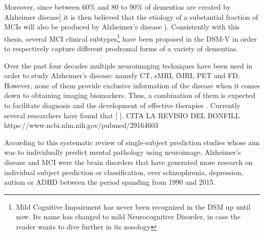 Moreover, since between 60\% and 80 to 90\% of dementias are created by Alzheimer disease\cite{NoAuthor2017, DSM-V-GOOGLESCHOLAR-CITARMILLOR}] it is then believed that the etiology of a substantial fraction of MCIs will also be produced by Alzheimer's disease \cite{DSM-V-GOOGLESCHOLAR-CITARMILLOR}). Consistently with this thesis, several MCI clinical subtypes\footnote{Mild Cognitive Impairment has never been recognized in the DSM up until now. Its name has changed to mild Neurocognitive Disorder, in case the reader wants to dive further in its nosology} have been proposed in the DSM-V in order to respectively capture different prodromal forms of a variety of dementias\cite{Petersen2004183}.



Over the past four decades multiple neuroimaging techniques have been used in order to study Alzheimer's disease: namely CT, sMRI, fMRI, PET and FD. However, none of them provide exclusive information of the disease when it comes down to obtaining imaging biomarkers. Thus, a combination of them is expected to facilitate diagnosis \cite{Rahim2017, Johnson2012} and the development of effective therapies \cite{Johnson2012}. Currently several researchers have found that [        ]. CITA LA REVISIO DEL BONFILL https://www.ncbi.nlm.nih.gov/pubmed/29164603



According to this systematic review \cite{Arbabshirani2017137} of single-subject prediction studies whose aim was to individually predict mental pathology using neuroimage, Alzheimer's disease and MCI were the brain disorders that have generated more research on individual subject prediction or classification, over schizophrenia, depression, autism or ADHD between the period spanding from 1990 and 2015. 
